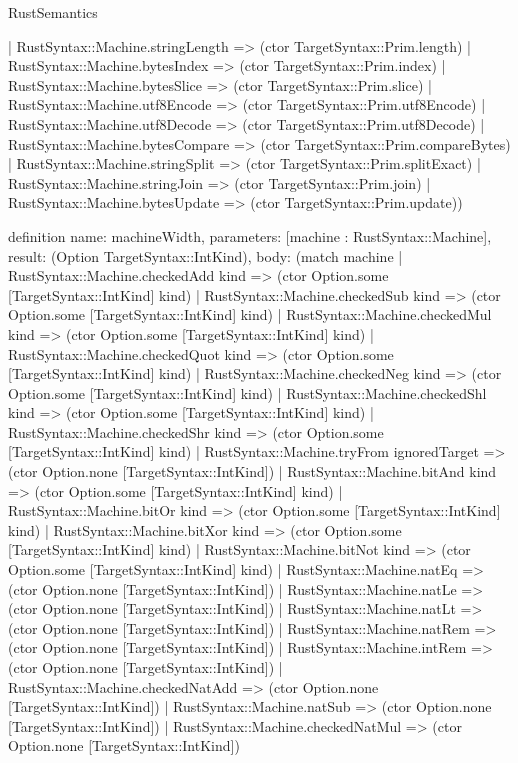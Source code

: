 \begin{lexlean}{RustSemantics}
\begin{semanticmodule}
{    | RustSyntax::Machine.stringLength => (ctor TargetSyntax::Prim.length)
    | RustSyntax::Machine.bytesIndex => (ctor TargetSyntax::Prim.index)
    | RustSyntax::Machine.bytesSlice => (ctor TargetSyntax::Prim.slice)
    | RustSyntax::Machine.utf8Encode => (ctor TargetSyntax::Prim.utf8Encode)
    | RustSyntax::Machine.utf8Decode => (ctor TargetSyntax::Prim.utf8Decode)
    | RustSyntax::Machine.bytesCompare => (ctor TargetSyntax::Prim.compareBytes)
    | RustSyntax::Machine.stringSplit => (ctor TargetSyntax::Prim.splitExact)
    | RustSyntax::Machine.stringJoin => (ctor TargetSyntax::Prim.join)
    | RustSyntax::Machine.bytesUpdate => (ctor TargetSyntax::Prim.update))
}

definition{
  name: machineWidth,
  parameters: [machine : RustSyntax::Machine],
  result: (Option TargetSyntax::IntKind),
  body: (match machine
    | RustSyntax::Machine.checkedAdd kind => (ctor Option.some [TargetSyntax::IntKind] kind)
    | RustSyntax::Machine.checkedSub kind => (ctor Option.some [TargetSyntax::IntKind] kind)
    | RustSyntax::Machine.checkedMul kind => (ctor Option.some [TargetSyntax::IntKind] kind)
    | RustSyntax::Machine.checkedQuot kind => (ctor Option.some [TargetSyntax::IntKind] kind)
    | RustSyntax::Machine.checkedNeg kind => (ctor Option.some [TargetSyntax::IntKind] kind)
    | RustSyntax::Machine.checkedShl kind => (ctor Option.some [TargetSyntax::IntKind] kind)
    | RustSyntax::Machine.checkedShr kind => (ctor Option.some [TargetSyntax::IntKind] kind)
    | RustSyntax::Machine.tryFrom ignoredTarget => (ctor Option.none [TargetSyntax::IntKind])
    | RustSyntax::Machine.bitAnd kind => (ctor Option.some [TargetSyntax::IntKind] kind)
    | RustSyntax::Machine.bitOr kind => (ctor Option.some [TargetSyntax::IntKind] kind)
    | RustSyntax::Machine.bitXor kind => (ctor Option.some [TargetSyntax::IntKind] kind)
    | RustSyntax::Machine.bitNot kind => (ctor Option.some [TargetSyntax::IntKind] kind)
    | RustSyntax::Machine.natEq => (ctor Option.none [TargetSyntax::IntKind])
    | RustSyntax::Machine.natLe => (ctor Option.none [TargetSyntax::IntKind])
    | RustSyntax::Machine.natLt => (ctor Option.none [TargetSyntax::IntKind])
    | RustSyntax::Machine.natRem => (ctor Option.none [TargetSyntax::IntKind])
    | RustSyntax::Machine.intRem => (ctor Option.none [TargetSyntax::IntKind])
    | RustSyntax::Machine.checkedNatAdd => (ctor Option.none [TargetSyntax::IntKind])
    | RustSyntax::Machine.natSub => (ctor Option.none [TargetSyntax::IntKind])
    | RustSyntax::Machine.checkedNatMul => (ctor Option.none [TargetSyntax::IntKind])
}
\end{semanticmodule}
\end{lexlean}
